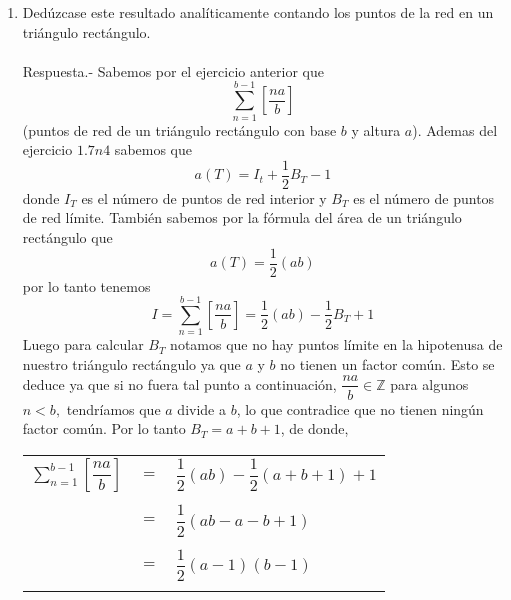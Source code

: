 \begin{enumerate}
\begin{enumerate}[\bfseries (a)]
	    \item Dedúzcase este resultado analíticamente contando los puntos de la red en un triángulo rectángulo.\\\\
		Respuesta.-\; Sabemos por el ejercicio anterior que $$\sum\limits_{n=1}^{b-1}\left[\dfrac{na}{b}\right]$$ (puntos de red de un triángulo rectángulo con base $b$ y altura $a$). Ademas del ejercicio $1.7 n 4$ sabemos que $$a(T)=I_t + \dfrac{1}{2}B_T - 1$$ donde $I_T$ es el número de puntos de red interior y $B_T$ es el número de puntos de red límite. También sabemos por la fórmula del área de un triángulo rectángulo que $$a(T)=\dfrac{1}{2}(ab)$$ por lo tanto tenemos $$I=\sum\limits_{n=1}^{b-1}\left[\dfrac{na}{b}\right]=\dfrac{1}{2}(ab)-\dfrac{1}{2}B_T + 1$$
		Luego para calcular $B_T$ notamos que no hay puntos límite en la hipotenusa de nuestro triángulo rectángulo ya que $a$ y $b$ no tienen un factor común. Esto se deduce ya que si no fuera tal punto a continuación, $\dfrac{na}{b} \in \mathbb{Z}$ para algunos $n<b,$ tendríamos que $a$ divide a $b$, lo que contradice que no tienen ningún factor común. Por lo tanto $B_T=a+b+1$, de donde,
		\begin{center}
		    \begin{tabular}{rcl}
			$\sum\limits_{n=1}^{b-1} \left[\dfrac{na}{b}\right]$&$=$&$\dfrac{1}{2}(ab) - \dfrac{1}{2}(a+b+1) + 1$\\\\
			&$=$&$\dfrac{1}{2} (ab-a-b+1)$\\\\
			&$=$&$\dfrac{1}{2}(a-1)(b-1)$\\\\
		    \end{tabular}
		\end{center}


\end{enumerate}
\end{enumerate}
